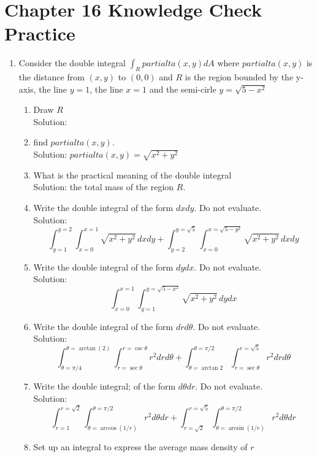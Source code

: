 \documentclass[11pt]{article}
\begin{document}
\section{Chapter 16 Knowledge Check Practice}
\begin{enumerate}
  \item  Consider the double integral $\int_R partialta(x,y) dA$ where $partialta(x,y)$ is the distance from $(x,y)$ to $(0,0)$ and $R$ is the region bounded by the y-axis, the line $y=1$, the line $x=1$ and the semi-cirle $y=\sqrt{5-x^2}$
    \renewcommand{\theenumi}{\Alph{enumi}}
  \begin{enumerate}
    \item Draw $R$\\
      Solution: 
    \item find $partialta(x,y)$.\\
      Solution: $partialta(x,y) = \sqrt{x^2+y^2}$
    \item What is the practical meaning of the double integral\\
      Solution: the total mass of the region $R$.
    \item Write the double integral of the form $dxdy$. Do not evaluate.\\
      Solution: \[\int_{y=1}^{y=2} \int_{x=0}^{x=1} \sqrt{x^2+y^2} \, dx dy + \int_{y=2}^{y=\sqrt{5}} \int_{x=0}^{x=\sqrt{5-y^2}} \sqrt{x^2+y^2} \, dx dy\]
    \item Write the double integral of the form $dydx$. Do not evaluate.\\
      Solution: \[\int_{x=0}^{x=1} \int_{y=1}^{y=\sqrt{5-x^2}} \sqrt{x^2+y^2} \, dy dx\]
    \item Write the double integral of the form $drd\theta$. Do not evaluate.\\
      Solution: \[\int_{\theta=\pi/4}^{\theta=\arctan(2)} \int_{r=\sec\theta}^{r=\csc\theta} r^2 dr d\theta + \int_{\theta=\arctan 2}^{\theta=\pi/2} \int_{r=\sec\theta}^{r=\sqrt{5}} r^2 dr d\theta\]
      \item Write the double integral; of the form $d\theta dr$. Do not evaluate.\\
        Solution: \[\int_{r=1}^{r=\sqrt{2}} \int_{\theta=\arccos(1/r)}^{\theta=\pi/2} r^2 d\theta dr + \int_{r=\sqrt{2}}^{r=\sqrt{5}} \int_{\theta=\arcsin(1/r)}^{\theta=\pi/2} r^2 d\theta dr\]
      \item Set up an integral to express the average mass density of $r$\\

\end{enumerate}
\end{enumerate}
\end{document}
